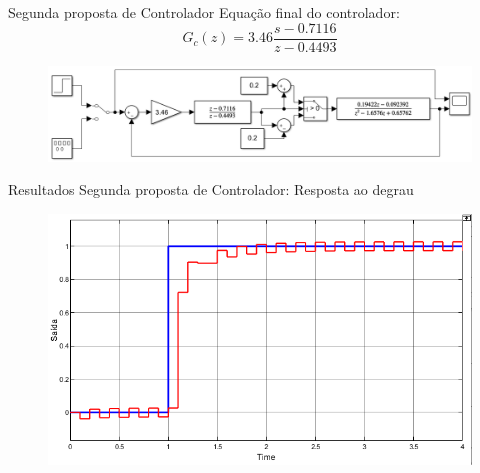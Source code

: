 \documentclass{beamer}
\begin{document}
\begin{frame}{Segunda proposta de Controlador}
Equação final do controlador:
\begin{equation}
G_{c}(z)=3.46\frac{s - 0.7116}{z - 0.4493}
\label{novogcz}
\end{equation}

\begin{figure}
    \centering
    \includegraphics[width = \linewidth]{src/tex/img/controle_2.PNG}
    \caption{}
    \label{fig:control_2}
\end{figure}
\end{frame}

\begin{frame}{Resultados Segunda proposta de Controlador: Resposta ao degrau}
\begin{figure}
    \centering
    \includegraphics[width = \linewidth]{src/tex/img/saida_controle_2.png}
    \caption{}
    \label{fig:controler1}
\end{figure}
\end{frame}
\end{document}
